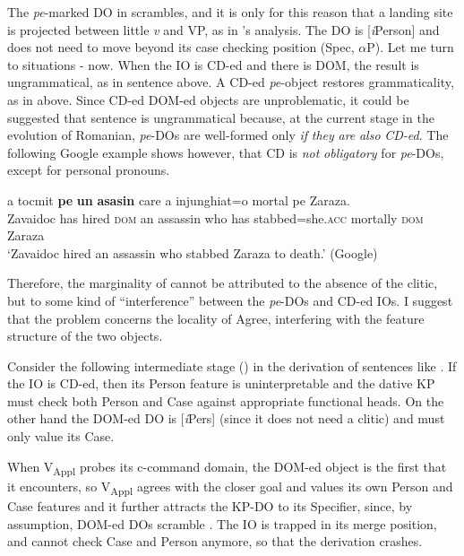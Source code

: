 \documentclass[output=paper,modfonts,nonflat,newtxmath]{langsci/langscibook}
\begin{document}
The \textit{pe}{}-marked DO in  scrambles, and it is only for this reason that a landing site is projected between little \textit{v} and VP, as in \citeauthor{López2012}’s analysis. The DO is [\textit{i}Person] and does not need to move beyond its case checking position (Spec, ${\alpha}$P). Let me turn to situations - now. When the IO is CD-ed and there is DOM, the result is ungrammatical, as in sentence  above. A CD-ed \textit{pe}{}-object restores grammaticality, as in  above. Since CD-ed DOM-ed objects are unproblematic, it could be suggested that sentence  is ungrammatical because, at the current stage in the evolution of Romanian, \textit{pe}{}-DOs are well-formed only \textit{if} \textit{they} \textit{are} \textit{also} \textit{CD-ed}. The following Google example shows however, that CD is \textit{not} \textit{obligatory} for \textit{pe}{}-DOs, except for personal pronouns.

\ea%
   \label{ex:cornilescu:31}
    {a} {tocmit} \textbf{pe} \textbf{un} \textbf{asasin} {care} {a} {injunghiat=o} {mortal} {pe} {Zaraza}.\\
       Zavaidoc has hired \textsc{dom} an assassin who has stabbed=she.\textsc{acc} mortally \textsc{dom} Zaraza\\
   \glt ‘Zavaidoc hired an assassin who stabbed Zaraza to death.’ (Google)
   \z

Therefore, the marginality of  cannot be attributed to the absence of the clitic, but to some kind of “interference” between the \textit{pe}{}-DOs and CD-ed IOs. I suggest that the problem concerns the locality of Agree, interfering with the feature structure of the two objects.

Consider the following intermediate stage () in the derivation of sentences like . If the IO is CD-ed, then its Person feature is uninterpretable and the dative KP must check both Person and Case against appropriate functional heads. On the other hand the DOM-ed DO is [\textit{i}Pers] (since it does not need a clitic) and must only value its Case.

When V\textsubscript{Appl} probes its c-command domain, the DOM-ed object is the first that it encounters, so V\textsubscript{Appl} agrees with the closer goal and values its own Person and Case features and it further attracts the KP-DO to its Specifier, since, by assumption, DOM-ed DOs scramble \citep{López2012}. The IO is trapped in its merge position, and cannot check Case and Person anymore, so that the derivation crashes.
\end{document}
